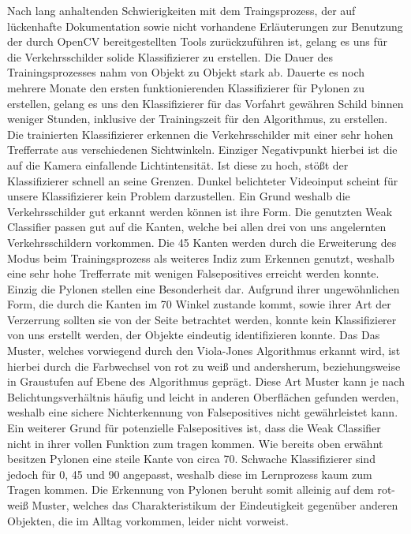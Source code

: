 Nach lang anhaltenden Schwierigkeiten mit dem Traingsprozess, der auf lückenhafte Dokumentation sowie nicht vorhandene Erläuterungen zur Benutzung der durch OpenCV bereitgestellten Tools zurückzuführen ist, gelang es uns für die Verkehrsschilder solide Klassifizierer zu erstellen. Die Dauer des Trainingsprozesses nahm von Objekt zu Objekt stark ab. Dauerte es noch mehrere Monate den ersten funktionierenden Klassifizierer für Pylonen zu erstellen, gelang es uns den Klassifizierer für das Vorfahrt gewähren Schild binnen weniger Stunden, inklusive der Trainingszeit für den Algorithmus, zu erstellen.\\ 
Die trainierten Klassifizierer erkennen die Verkehrsschilder mit einer sehr hohen Trefferrate aus verschiedenen Sichtwinkeln. Einziger Negativpunkt hierbei ist die auf die Kamera einfallende Lichtintensität. Ist diese zu hoch, stößt der Klassifizierer schnell an seine Grenzen. Dunkel belichteter Videoinput scheint für unsere Klassifizierer kein Problem darzustellen. Ein Grund weshalb die Verkehrsschilder gut erkannt werden können ist ihre Form. Die genutzten Weak Classifier passen gut auf die Kanten, welche bei allen drei von uns angelernten Verkehrsschildern vorkommen. Die 45\textdegree {} Kanten werden durch die Erweiterung des Modus beim Trainingsprozess als weiteres Indiz zum Erkennen genutzt, weshalb eine sehr hohe Trefferrate mit wenigen Falsepositives erreicht werden konnte.\\
Einzig die Pylonen stellen eine Besonderheit dar. Aufgrund ihrer ungewöhnlichen Form, die durch die Kanten im 70\textdegree {} Winkel zustande kommt, sowie ihrer Art der Verzerrung sollten sie von der Seite betrachtet werden, konnte kein Klassifizierer von uns erstellt werden, der Objekte eindeutig identifizieren konnte. Das Das Muster, welches vorwiegend durch den Viola-Jones Algorithmus erkannt wird, ist hierbei durch die Farbwechsel von rot zu weiß und andersherum, beziehungsweise in Graustufen auf Ebene des Algorithmus geprägt. Diese Art Muster kann je nach Belichtungsverhältnis häufig und leicht in anderen Oberflächen gefunden werden, weshalb eine sichere Nichterkennung von Falsepositives nicht gewährleistet kann. Ein weiterer Grund für potenzielle Falsepositives ist, dass die Weak Classifier nicht in ihrer vollen Funktion zum tragen kommen. Wie bereits oben erwähnt besitzen Pylonen eine steile Kante von circa 70\textdegree . Schwache Klassifizierer sind jedoch für 0\textdegree, 45\textdegree {} und 90\textdegree {} angepasst, weshalb diese im Lernprozess kaum zum Tragen kommen. Die Erkennung von Pylonen beruht somit alleinig auf dem rot-weiß Muster, welches das Charakteristikum der Eindeutigkeit gegenüber anderen Objekten, die im Alltag vorkommen, leider nicht vorweist.\\
